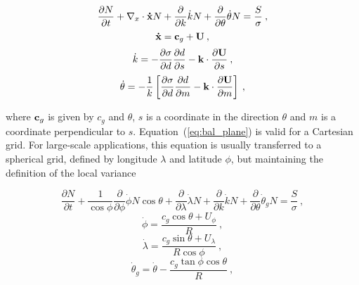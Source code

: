 
\begin{equation}
\frac{\partial N}{\partial t} + \nabla_x \cdot {\bf\dot{x}}N +
\frac{\partial}{\partial k} \dot{k}N +
\frac{\partial}{\partial \theta} \dot{\theta}N =
\frac{S}{\sigma} \: , \label{eq:bal_plane}
\end{equation}
\begin{equation}
{\bf \dot{x}} = {\bf c}_g + {\bf U} \: , \label{eq:x_dot}
\end{equation}
\begin{equation}
\dot{k} = - \frac{\partial \sigma}{\partial d}
\frac{\partial d}{\partial s} - {\mbox{\bf k}} \cdot
\frac{\partial {\bf U}}{\partial s} \: , \label{eq:k_dot}
\end{equation}
\begin{equation}
\dot{\theta} = - \frac{1}{k} \left [
\frac{\partial \sigma}{\partial d} \frac{\partial d}{\partial m}
- {\mbox{\bf k}} \cdot \frac{\partial {\bf U}}{\partial m}
\right ] \: , \label{eq:theta_dot}
\end{equation}

\noindent
where ${\bf c}_g$ is given by $c_g$ and $\theta$, $s$ is a coordinate in the
direction $\theta$ and $m$ is a coordinate perpendicular to $s$.
Equation~(\ref{eq:bal_plane}) is valid for a Cartesian grid. For large-scale
applications, this equation is usually transferred to a spherical grid,
defined by longitude $\lambda$ and latitude $\phi$, but maintaining the
definition of the local variance \citep[i.e., per unit surface, as
in][]{art:WAM88}


\begin{equation}
\frac{\partial N}{\partial t} +
\frac{1}{\cos \phi} \frac{\partial}{\partial \phi} \dot{\phi}
    N \cos \theta +
\frac{\partial}{\partial \lambda} \dot{\lambda}N +
\frac{\partial}{\partial k} \dot{k} N +
\frac{\partial}{\partial \theta} \dot{\theta}_g N
= \frac{S}{\sigma} \: ,\label{eq:bal_sphere}
\end{equation}
\begin{equation}
\dot{\phi} = \frac{c_g \cos \theta + U_\phi}{R}
\: , \label{eq:phi_dot}
\end{equation}
\begin{equation}
\dot{\lambda} =  \frac{c_g \sin \theta + U_\lambda}{R \cos \phi}
\: , \label{eq:lambda_dot}
\end{equation}
\begin{equation}
\dot{\theta}_g = \dot{\theta} -
\frac{c_g \tan \phi \cos \theta}{R}
\: , \label{eq:theta_g_dot}
\end{equation}

